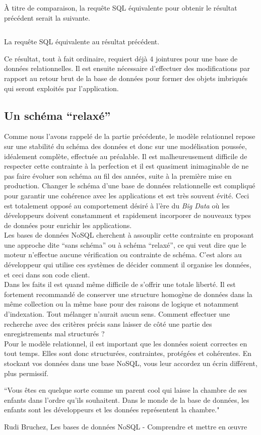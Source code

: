 	À titre de comparaison, la requête SQL équivalente pour obtenir le résultat précédent serait la suivante.
	\begin{listing}[H]
		\inputminted{sql}{code/commentaireSQL.sql}
		\caption{La requête SQL équivalente au résultat précédent.}
	\end{listing}
	Ce résultat, tout à fait ordinaire, requiert déjà 4 jointures pour une base de données relationnelles. Il est ensuite nécessaire d'effectuer des modifications par rapport au retour brut de la base de données pour former des objets imbriqués qui seront exploités par l'application.

\subsection{Un schéma \enquote{relaxé}}
	Comme nous l'avons rappelé de la partie précédente, le modèle relationnel repose sur une stabilité du schéma des données et donc sur une modélisation poussée, idéalement complète, effectuée au préalable. Il est malheureusement difficile de respecter cette contrainte à la perfection et il est quasiment inimaginable de ne pas faire évoluer son schéma au fil des années, suite à la première mise en production. Changer le schéma d'une base de données relationnelle est compliqué pour garantir une cohérence avec les applications et est très souvent évité. Ceci est totalement opposé au comportement désiré à l'ère du \textit{Big Data} où les développeurs doivent constamment et rapidement incorporer de nouveaux types de données pour enrichir les applications.\\

	Les bases de données NoSQL cherchent à assouplir cette contrainte en proposant une approche dite \enquote{sans schéma} ou à schéma \enquote{relaxé}, ce qui veut dire que le moteur n'effectue aucune vérification ou contrainte de schéma. C'est alors au développeur qui utilise ces systèmes de décider comment il organise les données, et ceci dans son code client.\\

	Dans les faits il est quand même difficile de s'offrir une totale liberté. Il est fortement recommandé de conserver une structure homogène de données dans la même collection ou la même base pour des raisons de logique et notamment d'indexation. Tout mélanger n'aurait aucun sens. Comment effectuer une recherche avec des critères précis sans laisser de côté une partie des enregistrements mal structurés ?\\

	Pour le modèle relationnel, il est important que les données soient correctes en tout temps. Elles sont donc structurées, contraintes, protégées et cohérentes. En stockant vos données dans une base NoSQL, vous leur accordez un écrin différent, plus permissif.
	\epigraph{``Vous êtes en quelque sorte comme un parent cool qui laisse la chambre de ses enfants dans l'ordre qu'ils souhaitent. Dans le monde de la base de données, les enfants sont les développeurs et les données représentent la chambre."}{\textup{Rudi Bruchez}, Les bases de données NoSQL - Comprendre et mettre en œuvre \cite{BD_NoSQL}}
